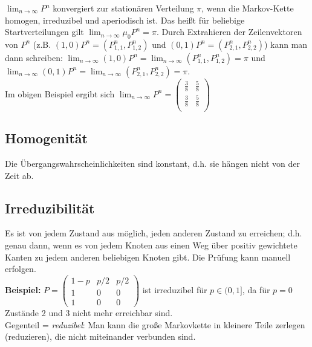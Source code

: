 \(\lim_{n\rightarrow\infty} P^n\) konvergiert zur stationären Verteilung \(\pi\), wenn die Markov-Kette homogen, irreduzibel und aperiodisch ist. Das heißt für beliebige Startverteilungen gilt \(\lim_{n\rightarrow\infty} \mu_0P^n = \pi\). Durch Extrahieren der Zeilenvektoren von \(P^n\) (z.B. \((1,0)P^n=(P^n_{1,1}, P^n_{1,2})\) und \((0,1)P^n=(P^n_{2,1}, P^n_{2,2})\)) kann man dann schreiben: \(\lim_{n\rightarrow\infty} (1,0)P^n = \lim_{n\rightarrow\infty} (P^n_{1,1}, P^n_{1,2}) = \pi\) und \(\lim_{n\rightarrow\infty} (0,1)P^n = \lim_{n\rightarrow\infty} (P^n_{2,1}, P^n_{2,2}) = \pi\).\\

Im obigen Beispiel ergibt sich \(\lim_{n\rightarrow\infty} P^n = \begin{pmatrix}
    \frac{3}{8} & \frac{5}{8}\\
    \frac{3}{8} & \frac{5}{8}\\
\end{pmatrix}\)


\subsection{Homogenität}

Die Übergangswahrscheinlichkeiten sind konstant, d.h. sie hängen nicht von der Zeit ab.\\


\subsection{Irreduzibilität}

Es ist von jedem Zustand aus möglich, jeden anderen Zustand zu erreichen; d.h. genau dann, wenn es von jedem Knoten aus einen Weg über positiv gewichtete Kanten zu jedem anderen beliebigen Knoten gibt.
Die Prüfung kann manuell erfolgen.\\

\textbf{Beispiel:}
\(
    P = \begin{pmatrix}
        1-p & p/2 & p/2\\
        1 & 0 & 0\\
        1 & 0 & 0
    \end{pmatrix}
\) ist irreduzibel für \(p\in (0,1]\), da für \(p=0\) Zustände 2 und 3 nicht mehr erreichbar sind.\\

Gegenteil = \emph{reduzibel}: Man kann die große Markovkette in kleinere Teile zerlegen (reduzieren), die nicht miteinander verbunden sind.\\

